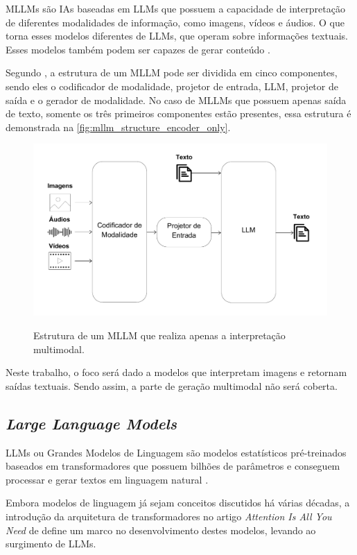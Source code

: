 \acp{MLLM} são \acp{IA} baseadas em \acp{LLM} que possuem a capacidade de interpretação de diferentes modalidades de informação, como imagens, vídeos e áudios.
O que torna esses modelos diferentes de \acp{LLM}, que operam sobre informações textuais. Esses modelos também podem ser capazes de gerar conteúdo
\cite{mllm_survey_2023, mllm_survey_2024}.

Segundo \textcite{mllm_survey_2024}, a estrutura de um \ac{MLLM} pode ser dividida em cinco componentes, sendo eles o codificador de modalidade, projetor de entrada,
\ac{LLM}, projetor de saída e o gerador de modalidade. No caso de \acp{MLLM} que possuem apenas saída de texto, somente os três primeiros componentes estão presentes,
essa estrutura é demonstrada na \autoref{fig:mllm_structure_encoder_only}.

\begin{figure}[ht]
      \centering
      \caption{\small Estrutura de um \ac{MLLM} que realiza apenas a interpretação multimodal.}
      \includegraphics[width=0.7\columnwidth,keepaspectratio]{images/mllm_structure_encoder_only.pdf}
      \label{fig:mllm_structure_encoder_only}
\end{figure}

Neste trabalho, o foco será dado a modelos que interpretam imagens e retornam saídas textuais. Sendo assim, a parte de geração multimodal não será coberta.

\subsection{\textit{Large Language Models}}

\acp{LLM} ou Grandes Modelos de Linguagem são modelos estatísticos pré-treinados baseados em transformadores que possuem bilhões de parâmetros e conseguem processar e
gerar textos em linguagem natural \cite{llm_survey_2024}.

Embora modelos de linguagem já sejam conceitos discutidos há várias décadas, a introdução da arquitetura de transformadores no artigo \textit{Attention Is All You Need}
de \textcite{transformer} define um marco no desenvolvimento destes modelos, levando ao surgimento de \acp{LLM}.

